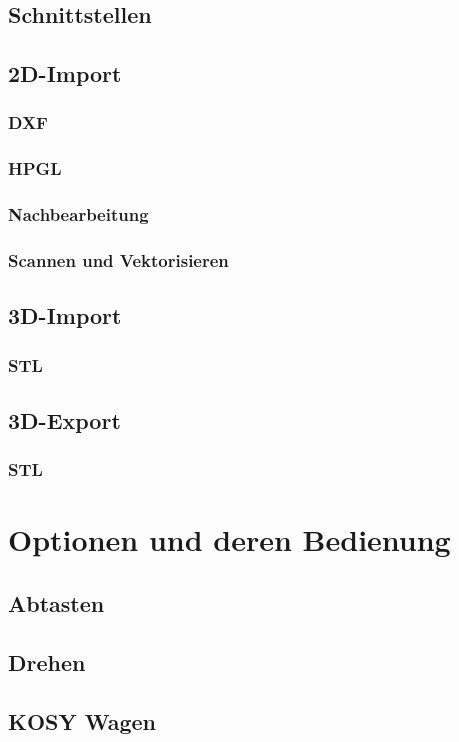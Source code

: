 \documentclass[14pt,a4paper]{book}
\begin{document}
	\section{Schnittstellen} 
	\section{2D-Import} 
		\subsection{DXF}
		\subsection{HPGL} 
		\subsection{Nachbearbeitung} 
		\subsection{Scannen und Vektorisieren} 
	\section{3D-Import} 
		\subsection{STL}
	\section{3D-Export} 
		\subsection{STL}

\chapter{Optionen und deren Bedienung} 
	\section{Abtasten}
	\section{Drehen} 
	\section{KOSY Wagen} 
\end{document}
